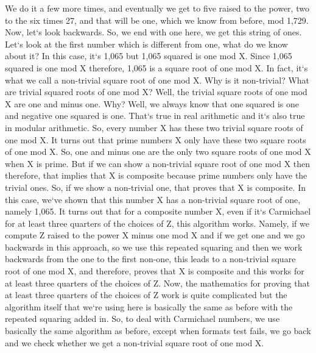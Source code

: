 We do it a few more times, and eventually we get to five raised to the power, two to the six times 27, and that will be one, which we know from before, mod 1,729.
Now, let`s look backwards.
So, we end with one here, we get this string of ones.
Let`s look at the first number which is different from one, what do we know about it? In this case, it`s 1,065 but 1,065 squared is one mod X\@.
Since 1,065 squared is one mod X therefore, 1,065 is a square root of one mod X\@.
In fact, it`s what we call a non-trivial square root of one mod X\@.
Why is it non-trivial? What are trivial squared roots of one mod X? Well, the trivial square roots of one mod X are one and minus one.
Why? Well, we always know that one squared is one and negative one squared is one.
That`s true in real arithmetic and it`s also true in modular arithmetic.
So, every number X has these two trivial square roots of one mod X\@.
It turns out that prime numbers X only have these two square roots of one mod X\@.
So, one and minus one are the only two square roots of one mod X when X is prime.
But if we can show a non-trivial square root of one mod X then therefore, that implies that X is composite because prime numbers only have the trivial ones.
So, if we show a non-trivial one, that proves that X is composite.
In this case, we`ve shown that this number X has a non-trivial square root of one, namely 1,065.
It turns out that for a composite number X, even if it`s Carmichael for at least three quarters of the choices of Z, this algorithm works.
Namely, if we compute Z raised to the power X minus one mod X and if we get one and we go backwards in this approach, so we use this repeated squaring and then we work backwards from the one to the first non-one, this leads to a non-trivial square root of one mod X, and therefore, proves that X is composite and this works for at least three quarters of the choices of Z\@.
Now, the mathematics for proving that at least three quarters of the choices of Z work is quite complicated but the algorithm itself that we`re using here is basically the same as before with the repeated squaring added in.
So, to deal with Carmichael numbers, we use basically the same algorithm as before, except when formats test fails, we go back and we check whether we get a non-trivial square root of one mod X\@.

